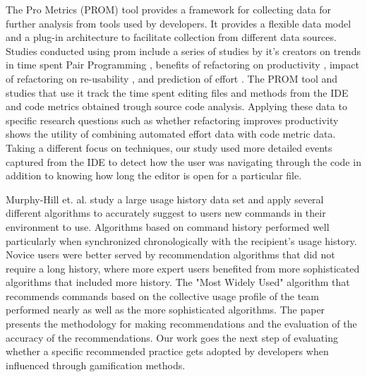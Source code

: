 \documentclass{sig-alternate}
\begin{document}
The Pro Metrics (PROM) tool provides a framework for collecting data for further analysis from tools used by developers.\cite{Coman2009Casestudy}  It provides a flexible data model and a plug-in architecture to facilitate collection from different data sources.  Studies conducted using prom include a series of studies by it's creators on trends in time spent Pair Programming \cite{Coman2008Investigating}, benefits of refactoring on productivity \cite{Moser2008Case}, impact of refactoring on re-usability \cite{Moser2006Does}, and prediction of effort \cite{Abrahamsson2007Effort}.  The PROM tool and studies that use it track the time spent editing files and methods from the IDE and code metrics obtained trough source code analysis.  Applying these data to specific research questions such as whether refactoring improves productivity \cite{Moser2008Case} shows the utility of combining automated effort data with code metric data.  Taking a different focus on techniques, our study used more detailed events captured from the IDE  to detect how the user was navigating through the code in addition to knowing how long the editor is open for a particular file.

Murphy-Hill et. al. study a large usage history data set and apply several different algorithms to accurately suggest to users new commands in their environment to use.\cite{MurphyHill2012Improving} Algorithms based on command history performed well particularly when synchronized chronologically with the recipient's usage history. Novice users were better served by recommendation algorithms that did not require a long history, where more expert users benefited from more sophisticated algorithms that included more history. The "Most Widely Used" algorithm that recommends commands based on the collective usage profile of the team performed nearly as well as the more sophisticated algorithms. The paper presents the methodology for making recommendations and the evaluation of the accuracy of the recommendations. Our work goes the next step of evaluating whether a specific recommended practice gets adopted by developers when influenced through gamification methods.
\end{document}
